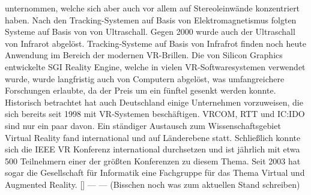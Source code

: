 \documentclass[a4paper,12pt,oneside]{article}
\begin{document}
        unternommen, welche sich aber auch vor allem auf Stereoleinwände konzentriert haben.
        Nach den Tracking-Systemen auf Basis von Elektromagnetismus folgten Systeme auf
        Basis von von Ultraschall. Gegen 2000 wurde auch der Ultraschall von Infrarot
        abgelöst. Tracking-Systeme auf Basis von Infrafrot finden noch heute Anwendung im
        Bereich der modernen VR-Brillen.
        Die von Silicon Graphics entwickelte SGI Reality Engine, welche in vielen
        VR-Softwaresystemen verwendet wurde, wurde langfristig auch von Computern
        abgelöst, was umfangreichere Forschungen erlaubte, da der Preis um ein fünftel
        gesenkt werden konnte.
        Historisch betrachtet hat auch Deutschland einige Unternehmen vorzuweisen, die sich
        bereits seit 1998 mit VR-Systemen beschäftigen. VRCOM, RTT und IC:IDO sind nur ein
        paar davon.
        Ein ständiger Austausch zum Wissenschaftsgebiet Virtual Reality fand international
        und auf Länderebene statt. Schließlich konnte sich die IEEE VR Konferenz
        international durchsetzen und ist jährlich mit etwa 500 Teilnehmern einer der
        größten Konferenzen zu diesem Thema.
        Seit 2003 hat sogar die Gesellschaft für Informatik eine Fachgruppe für das Thema
        Virtual und Augmented Reality. [\cite[19-21]{Dorner2013}]
        --- --- (Bisschen noch was zum aktuellen Stand schreiben)
\end{document}
